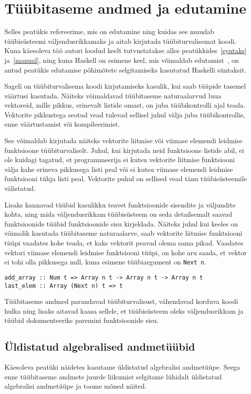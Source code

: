 \documentclass[12pt]{article}
\newcommand\peatykk[1]{
  \clearpage
  \section{#1}}
\begin{document}
  \peatykk{Tüübitaseme andmed ja edutamine}\label{edutamine}
    Selles peatükis refereerime, mis on edutamine ning kuidas see muudab tüübisüsteemi väljendusrikkamaks ja aitab kirjutada tüübiturvalisemat koodi. Kuna käesoleva töö autori loodud keelt tutvustatakse alles peatükkides~\ref{syntaks} ja~\ref{manual}, ning kuna Haskell on esimene keel, mis võimaldab edutamist~\cite{Giv}, on antud peatükis edutamise põhimõtete selgitamiseks kasutatud Haskelli süntaksit.

    Sageli on tüübiturvalisema koodi kirjutamiseks kasulik, kui saab tüüpide tasemel väärtusi kasutada. Näiteks võimaldavad tüübitaseme naturaalarvud luua vektoreid, mille pikkus, erinevalt listide omast, on juba tüübikontrolli ajal teada. Vektorite pikkustega seotud vead tulevad sellisel juhul välja juba tüübikontrollis, enne väärtustamist või kompileerimist.

    See võimaldab kirjutada näiteks vektorite liitmise või viimase elemendi leidmise funktsioone tüübiturvaliselt. Juhul, kui kirjutada neid funktsioone listide abil, ei ole kuidagi tagatud, et programmeerija ei kutsu vektorite liitmise funktsiooni välja kahe erineva pikkusega listi peal või ei kutsu viimase elemendi leidmise funktsiooni tühja listi peal. Vektorite puhul on sellised vead tänu tüübisüsteemile välistatud.

    Lisaks kannavad tüübid kasulikku teavet funktsioonide sisendite ja väljundite kohta, ning mida väljendusrikkam tüübisüsteem on seda detailsemalt saavad funktsioonide tüübid funktsioonide sisu kirjeldada. Näiteks juhul kui keeles on võimalik kasutada tüübitaseme naturaalarve, saab vektorite liitmise funktsiooni tüüpi vaadates kohe teada, et kaks vektorit peavad olema sama pikad. Vaadates vektori viimase elemendi leidmise funktsiooni tüüpi, on kohe aru saada, et vektor ei tohi olla pikkusega null, kuna esimene tüübiargument on \verb!Next n!.

    \begin{verbatim}add_array :: Num t => Array n t -> Array n t -> Array n t
last_elem :: Array (Next n) t => t\end{verbatim}

    Tüübitaseme andmed parandavad tüübiturvalisust, vähendavad korduva koodi hulka ning lisaks aitavad kaasa sellele, et tüübisüsteem oleks väljendusrikkam ja tüübid dokumenteeriks paremini funktsioonide sisu.
    \subsection{Üldistatud algebralised andmetüübid}
      Käesoleva peatüki näidetes kasutame üldistatud algebralisi andmetüüpe. Seega enne tüübitaseme andmete juurde liikumist selgitame lühidalt üldistatud algebralisi andmetüüpe ja toome mõned näited.
\end{document}
